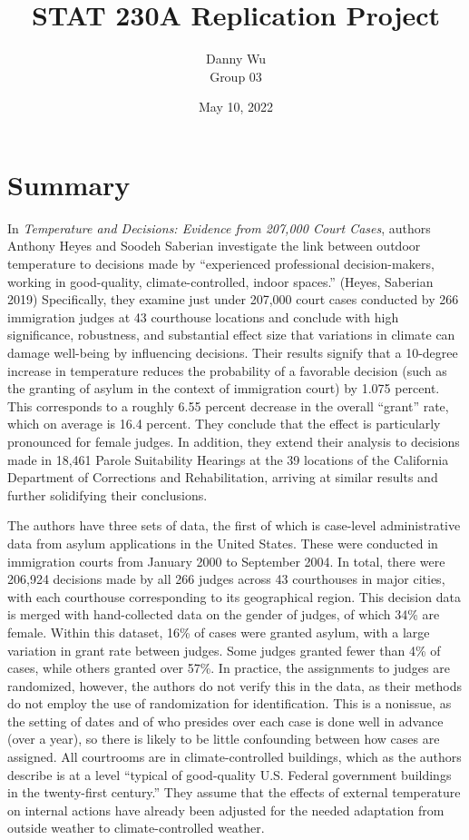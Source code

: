 \documentclass{article}
\begin{document}
	
	\title{STAT 230A Replication Project}
	\author{Danny Wu \\
		Group 03}
	\date{May 10, 2022}
	\maketitle
	
	\section{Summary}
	
	In \textit{Temperature and Decisions: Evidence from 207,000 Court Cases}, authors Anthony Heyes and Soodeh Saberian investigate the link between outdoor temperature to decisions made by “experienced professional decision-makers, working in good-quality, climate-controlled, indoor spaces.” (Heyes, Saberian 2019) Specifically, they examine just under 207,000 court cases conducted by 266 immigration judges at 43 courthouse locations and conclude with high significance, robustness, and substantial effect size that variations in climate can damage well-being by influencing decisions. Their results signify that a 10-degree increase in temperature reduces the probability of a favorable decision (such as the granting of asylum in the context of immigration court) by 1.075 percent. This corresponds to a roughly 6.55 percent decrease in the overall “grant” rate, which on average is 16.4 percent. They conclude that the effect is particularly pronounced for female judges. In addition, they extend their analysis to decisions made in 18,461 Parole Suitability Hearings at the 39 locations of the California Department of Corrections and Rehabilitation, arriving at similar results and further solidifying their conclusions. 
	
	The authors have three sets of data, the first of which is case-level administrative data from asylum applications in the United States. These were conducted in immigration courts from January 2000 to September 2004. In total, there were 206,924 decisions made by all 266 judges across 43 courthouses in major cities, with each courthouse corresponding to its geographical region. This decision data is merged with hand-collected data on the gender of judges, of which 34\% are female. Within this dataset, 16\% of cases were granted asylum, with a large variation in grant rate between judges. Some judges granted fewer than 4\% of cases, while others granted over 57\%. In practice, the assignments to judges are randomized, however, the authors do not verify this in the data, as their methods do not employ the use of randomization for identification. This is a nonissue, as the setting of dates and of who presides over each case is done well in advance (over a year), so there is likely to be little confounding between how cases are assigned. All courtrooms are in climate-controlled buildings, which as the authors describe is at a level “typical of good-quality U.S. Federal government buildings in the twenty-first century.” They assume that the effects of external temperature on internal actions have already been adjusted for the needed adaptation from outside weather to climate-controlled weather. 
	
\end{document}
